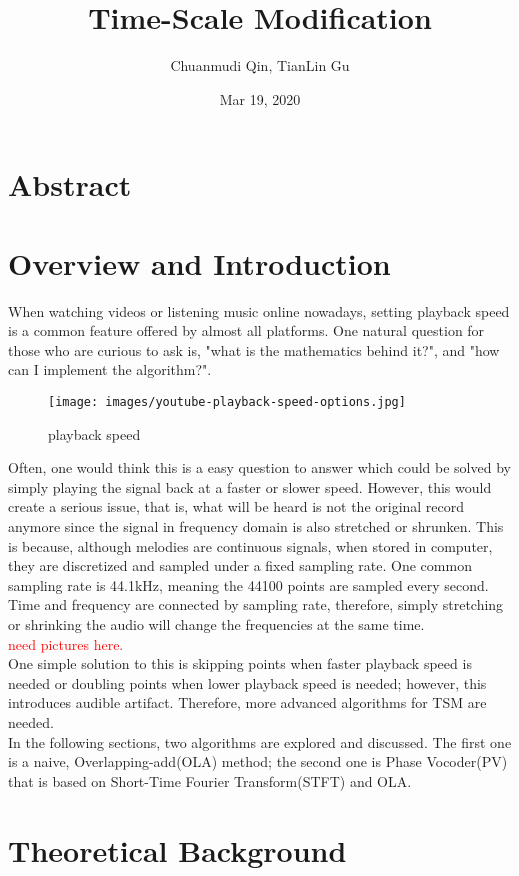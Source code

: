 \documentclass[11pt]{article}
\title{\vspace{-7.5ex}\textbf{\Large Time-Scale Modification}\vspace{-1.7ex}}
\author{Chuanmudi Qin, TianLin Gu}
\date{\vspace{-1ex}Mar 19, 2020\vspace{-5ex}}
\begin{document}
\maketitle
\section{Abstract}
\section{Overview and Introduction}
When watching videos or listening music online nowadays, setting playback speed is a common feature offered by almost all 
platforms. One natural question for those who are curious to ask is, "what is the mathematics behind it?", and "how can I implement the algorithm?".  
\begin{figure}[H]
\centering        
\texttt{[image: images/youtube-playback-speed-options.jpg]}
\caption{playback speed}
\end{figure}
\noindent Often, one would think this is a easy question to answer which could be solved by simply playing the signal back at a faster  or slower speed. However, this would create a serious issue, that is, what will be heard is not the original record anymore since the signal in frequency domain is also stretched or shrunken. This is because, although melodies are continuous signals, when stored in computer, they are discretized and sampled under a fixed sampling rate. One common sampling rate is 44.1kHz, meaning the 44100 points are sampled every second. Time and frequency are connected by sampling rate, therefore, simply stretching or shrinking the audio will change the frequencies at the same time.    \\
\textcolor{red}{need pictures here.}\\
\noindent One simple solution to this is skipping points when faster playback speed is needed or doubling points when lower playback speed is needed; however, this introduces audible artifact. Therefore, more advanced algorithms for TSM are needed. \\
In the following sections, two algorithms are explored and discussed. The first one is a naive, Overlapping-add(OLA) method; the second one is Phase Vocoder(PV) that is based on Short-Time Fourier Transform(STFT) and OLA.  
\section{Theoretical Background}
\end{document}
